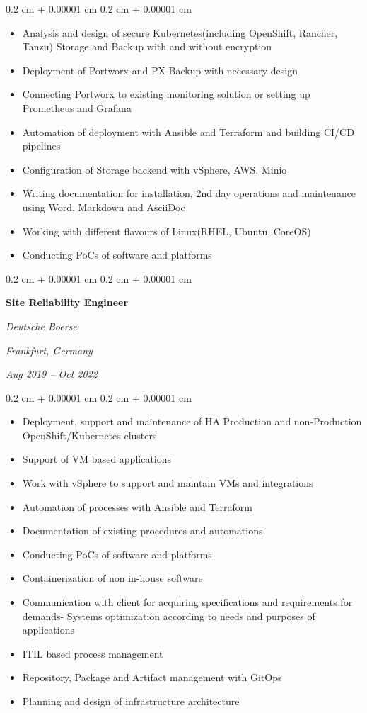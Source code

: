 \documentclass[10pt, letterpaper]{article}
\newenvironment{highlights}{
  \begin{itemize}[
        topsep=0.10 cm,
        parsep=0.10 cm,
        partopsep=0pt,
        itemsep=0pt,
        leftmargin=0.4 cm + 10pt
      ]
    }{
  \end{itemize}
} %
\newenvironment{onecolentry}{
  \begin{adjustwidth}{
      0.2 cm + 0.00001 cm
    }{
      0.2 cm + 0.00001 cm
    }
  }{
  \end{adjustwidth}
} %
\newenvironment{twocolentry}[2][]{
  \onecolentry
  \def\secondColumn{#2}
  \setcolumnwidth{\fill, 4.5 cm}
  \begin{paracol}{2}
  }{
    \switchcolumn \raggedleft \secondColumn
  \end{paracol}
  \endonecolentry
} %
\begin{document}
\begin{onecolentry}
  \begin{highlights}
  \item  Analysis and design of secure Kubernetes(including
    OpenShift, Rancher, Tanzu) Storage and Backup with and without encryption
  \item  Deployment of Portworx and PX-Backup with necessary design
  \item  Connecting Portworx to existing monitoring solution or
    setting up Prometheus and Grafana
  \item  Automation of deployment with Ansible and Terraform and
    building CI/CD pipelines
  \item  Configuration of Storage backend with vSphere, AWS, Minio
  \item  Writing documentation for installation, 2nd day operations
    and maintenance using Word, Markdown and AsciiDoc
  \item  Working with different flavours of Linux(RHEL, Ubuntu, CoreOS)
  \item  Conducting PoCs of software and platforms
  \end{highlights}
\end{onecolentry}

\vspace{0.3 cm}

\begin{twocolentry}{
    \textit{Frankfurt, Germany}

  \textit{Aug 2019 – Oct 2022}}
  \textbf{Site Reliability Engineer}

  \textit{Deutsche Boerse}
\end{twocolentry}

\vspace{0.2 cm}
\begin{onecolentry}
  \begin{highlights}
  \item Deployment, support and maintenance of HA Production and
    non-Production OpenShift/Kubernetes clusters
  \item Support of VM based applications
  \item Work with vSphere to support and maintain VMs and integrations
  \item Automation of processes with Ansible and Terraform
  \item Documentation of existing procedures and automations
  \item Conducting PoCs of software and platforms
  \item Containerization of non in-house software
  \item Communication with client for acquiring specifications and
    requirements for demands- Systems optimization according to needs
    and purposes of applications
  \item ITIL based process management
  \item Repository, Package and Artifact management with GitOps
  \item Planning and design of infrastructure architecture
  \end{highlights}
\end{onecolentry}
\end{document}
